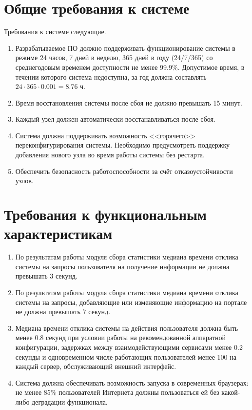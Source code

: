 \section*{Общие требования к системе}
Требования к системе следующие.
\begin{enumerate}
	\item Разрабатываемое ПО должно поддерживать функционирование системы в режиме 24 часов, 7 дней в неделю, 365 дней в году (24/7/365) со среднегодовым временем доступности не менее 99.9\%. Допустимое время, в течении которого система недоступна, за год должна составлять $24\cdot365\cdot0.001=8.76$ ч.
	
	\item Время восстановления системы после сбоя не должно превышать 15 минут.
	
	\item Каждый узел должен автоматически восстанавливаться после сбоя.
	
	\item Система должна поддерживать возможность <<горячего>> переконфигурирования системы. Необходимо предусмотреть поддержку добавления нового узла во время работы системы без рестарта.
	
	\item Обеспечить безопасность работоспособности за счёт отказоустойчивости узлов.
\end{enumerate}

\section*{Требования к функциональным характеристикам}
\begin{enumerate}
	\item По результатам работы модуля сбора статистики медиана времени отклика системы на запросы пользователя на получение информации не должна превышать 3 секунд.
	
	\item По результатам работы модуля сбора статистики медиана времени отклика системы на запросы, добавляющие или изменяющие информацию на портале не должна превышать 7 секунд.
	
	\item Медиана времени отклика системы на действия пользователя должна быть менее 0.8 секунд при условии работы на рекомендованной аппаратной конфигурации, задержках между взаимодействующими сервисами менее 0.2 секунды и одновременном числе работающих пользователей менее 100 на каждый сервер, обслуживающий внешний интерфейс.
	
	\item Система должна обеспечивать возможность запуска в современных браузерах: не менее 85\% пользователей Интернета должны пользоваться ей без какой-либо деградации функционала.
\end{enumerate}

